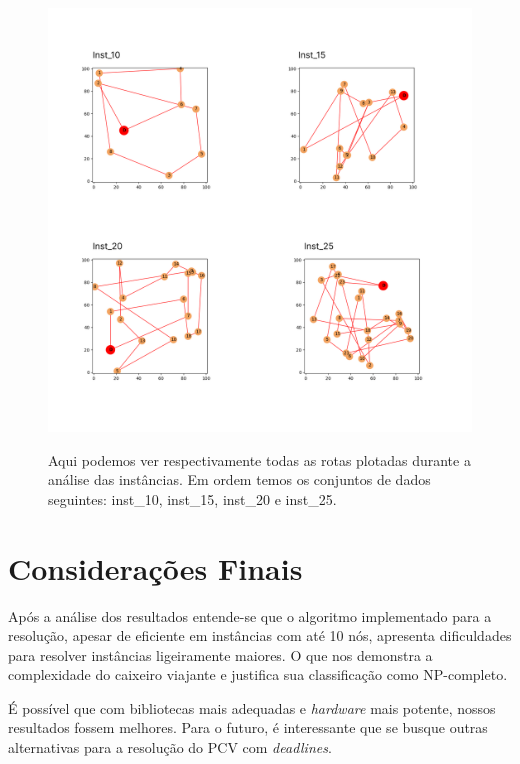 \documentclass[12pt]{article}
\begin{document}
\begin{figure}[ht]
  \centering
  \includegraphics[scale=0.3]{imagens/images_compiled.png}
  \label{graph_inst}
  \caption{Aqui podemos ver respectivamente todas as rotas plotadas durante a análise das instâncias. Em ordem temos os conjuntos de dados seguintes: inst\_10, inst\_15, inst\_20 e inst\_25.}

\end{figure}

\FloatBarrier

\section{Considerações Finais}

Após a análise dos resultados entende-se que o algoritmo implementado para a resolução, apesar de eficiente em instâncias com até 10 nós, apresenta dificuldades para resolver instâncias ligeiramente maiores. O que nos demonstra a complexidade do caixeiro viajante e justifica sua classificação como NP-completo.

É possível que com bibliotecas mais adequadas e {\it hardware} mais potente, nossos resultados fossem melhores. Para o futuro, é interessante que se busque outras alternativas para a resolução do PCV com {\it deadlines}.




\end{document}
